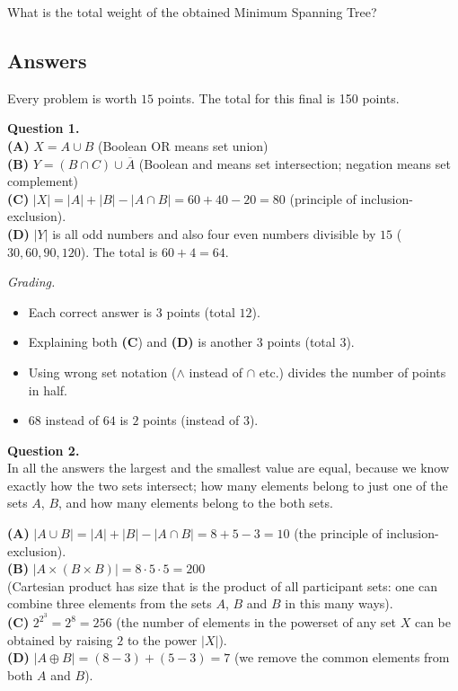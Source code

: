 \documentclass[jou]{apa6}
\begin{document}
What is the total weight of the obtained Minimum Spanning Tree?





\mbox{}
\newpage
\subsection{Answers}

Every problem is worth $15$ points. The total for this final is 150 points.


\vspace{4pt}
{\bf Question 1.}\\

{\bf (A)} $X = A \cup B$ (Boolean OR means set union)\\
{\bf (B)} $Y = (B \cap C) \cup \overline{A}$ (Boolean and means set intersection; negation means set complement)\\
{\bf (C)} $|X| = |A| + |B| - |A \cap B| = 60+40-20 = 80$ (principle of inclusion-exclusion).\\
{\bf (D)} $|Y|$ is all odd numbers and also four even numbers divisible by $15$
($30, 60, 90, 120$). The total is $60 + 4 = 64$. 

{\scriptsize
{\em Grading.} 
\begin{itemize}
\item Each correct answer is $3$ points (total $12$). 
\item Explaining both {\bf (C}) and {\bf (D)} is another $3$ points (total $3$).
\item Using wrong set notation ($\wedge$ instead of $\cap$ etc.) divides the number of points in half.
\item $68$ instead of $64$ is $2$ points (instead of $3$). 
\end{itemize}
}


\vspace{10pt}
{\bf Question 2.}\\
In all the answers the largest and the smallest value are equal, because
we know exactly how the two sets intersect; how many elements belong to just
one of the sets $A$, $B$, and how many elements belong to the both sets. 

{\bf (A)} $|A \cup B| = |A| + |B| - |A \cap B| = 8+5-3 = 10$ (the principle of inclusion-exclusion).\\
{\bf (B)} $|A \times (B \times B)| = 8 \cdot 5 \cdot 5 = 200$\\
(Cartesian product has size that is the product of all participant sets: 
one can combine three elements from the sets $A$, $B$ and $B$ in this many ways).\\
{\bf (C)} $2^{2^3} = 2^8 = 256$ (the number of elements in the powerset 
of any set $X$ can be obtained by raising $2$ to the power $|X|$).\\
{\bf (D)} $|A \oplus B| = (8-3) + (5-3) = 7$ (we remove the common elements from both $A$ and $B$). 
\end{document}
